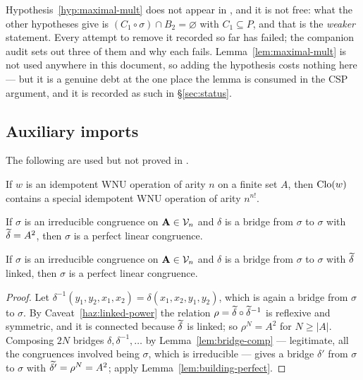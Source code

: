 \begin{hazard}\label{haz:maximal-mult-hyp}
Hypothesis~\ref{hyp:maximal-mult} does not appear in
\cite{ZhukSimplified}, and it is not free: what the other hypotheses give is
$(C_{1}\circ\sigma)\cap B_{2}=\varnothing$ with $C_{1}\subseteq P$, and that
is the \emph{weaker} statement. Every attempt to remove it recorded so far has
failed; the companion audit sets out three of them and why each fails.
Lemma~\ref{lem:maximal-mult} is not used anywhere in this document, so adding
the hypothesis costs nothing here --- but it is a genuine debt at the one place
the lemma is consumed in the CSP argument, and it is recorded as such in
\S\ref{sec:status}.
\end{hazard}

\subsection{Auxiliary imports}

The following are used but not proved in \cite{ZhukSimplified}.

\begin{lemma}\label{lem:special-wnu}
If $w$ is an idempotent WNU operation of arity $n$ on a finite set $A$, then
$\operatorname{Clo}(w)$ contains a special idempotent WNU operation of arity $n^{n!}$.
\end{lemma}

\begin{lemma}\label{lem:building-perfect}
If $\sigma$ is an irreducible congruence on $\mathbf A\in\mathcal V_{n}$ and $\delta$ is a
bridge from $\sigma$ to $\sigma$ with $\widetilde{\delta}=A^{2}$, then $\sigma$ is a
perfect linear congruence.
\end{lemma}

\begin{lemma}\label{lem:perfect-from-linked}
If $\sigma$ is an irreducible congruence on $\mathbf A\in\mathcal V_{n}$ and $\delta$ is a
bridge from $\sigma$ to $\sigma$ with $\widetilde{\delta}$ linked, then $\sigma$ is
a perfect linear congruence.
\end{lemma}

\begin{proof}
Let $\delta^{-1}(y_{1},y_{2},x_{1},x_{2})=\delta(x_{1},x_{2},y_{1},y_{2})$,
which is again a bridge from $\sigma$ to $\sigma$. By
Caveat~\ref{haz:linked-power} the relation
$\rho=\widetilde{\delta}\circ\widetilde{\delta}^{-1}$ is reflexive and symmetric, and it
is connected because $\widetilde{\delta}$ is linked; so $\rho^{N}=A^{2}$ for
$N\ge|A|$. Composing $2N$ bridges $\delta,\delta^{-1},\dots$ by
Lemma~\ref{lem:bridge-comp} --- legitimate, all the congruences involved being
$\sigma$, which is irreducible --- gives a bridge $\delta'$ from $\sigma$ to
$\sigma$ with $\widetilde{\delta'}=\rho^{N}=A^{2}$; apply
Lemma~\ref{lem:building-perfect}.
\end{proof}

